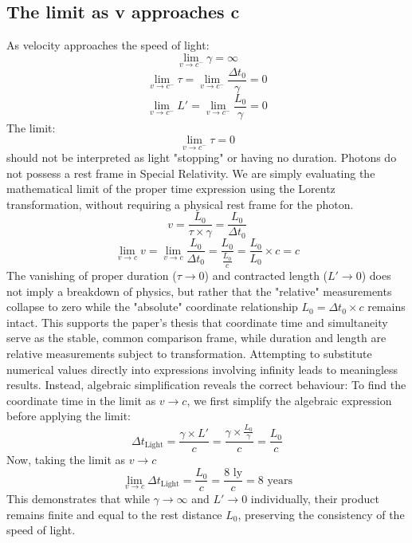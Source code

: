 \documentclass[pdflatex,sn-basic]{sn-jnl}
\theoremstyle{thmstyleone}%
\theoremstyle{thmstyletwo}%
\theoremstyle{thmstylethree}%
\begin{document}
	\subsection{The limit as v approaches c}\label{subsec3_7}
		As velocity approaches the speed of light: 
		\begin{equation*}
  			\lim_{v \to c^-} \gamma = \infty
		\end{equation*}
		\begin{equation*}
  			\lim_{v \to c^-} \tau = \lim_{v \to c^-} \frac{\Delta t_0}{\gamma} = 0
		\end{equation*}
		\begin{equation*}
  			\lim_{v \to c^-} L' = \lim_{v \to c^-} \frac{L_0}{\gamma} = 0
		\end{equation*}
The limit:
		\begin{equation*}
  			\lim_{v \to c^-} \tau = 0  
		\end{equation*}
should not be interpreted as light "stopping" or having no duration. Photons do not possess a rest frame in Special Relativity. We are simply evaluating the mathematical limit of the proper time expression using the Lorentz transformation, without requiring a physical rest frame for the photon.
		\begin{equation*}
  			v = \frac{L_0}{\tau \times \gamma} = \frac{L_0}{\Delta t_0}
		\end{equation*}
		\begin{equation*}
  			\lim_{v \to c} v = \lim_{v \to c} \frac{L_0}{\Delta t_0} = \frac{L_0}{\frac{L_0} c} = \frac{L_0} {L_0} \times c = c
		\end{equation*}
The vanishing of proper duration ($\tau \to 0$) and contracted length ($L' \to 0$) does not imply a breakdown of physics, but rather that the "relative" measurements collapse to zero while the "absolute" coordinate relationship $L_0 = \Delta t_0 \times c$ remains intact.
	This supports the paper's thesis that coordinate time and simultaneity serve as the stable, common comparison frame, while duration and length are relative measurements subject to transformation.
	Attempting to substitute numerical values directly into expressions involving infinity leads to meaningless results. Instead, algebraic simplification reveals the correct behaviour:
	To find the coordinate time in the limit as $v \to c$, we first simplify the algebraic expression before applying the limit:
		\begin{equation*}
  			\Delta t_{\text{Light}} = \frac{\gamma \times L'}{c} = \frac{\gamma \times \frac{L_0}{\gamma}}{c} = \frac{L_0}{c}
		\end{equation*}
  Now, taking the limit as $v \to c$
		\begin{equation*}
  			\lim_{v \to c} \Delta t_{\text{Light}} = \frac{L_0}{c} = \frac{8 \text{ ly}}{c} = 8 \text{ years}
		\end{equation*}
  	This demonstrates that while $\gamma \to \infty$ and $L' \to 0$ individually, their product remains finite and equal to the rest distance $L_0$, preserving the consistency of the speed of light.
\end{document}
